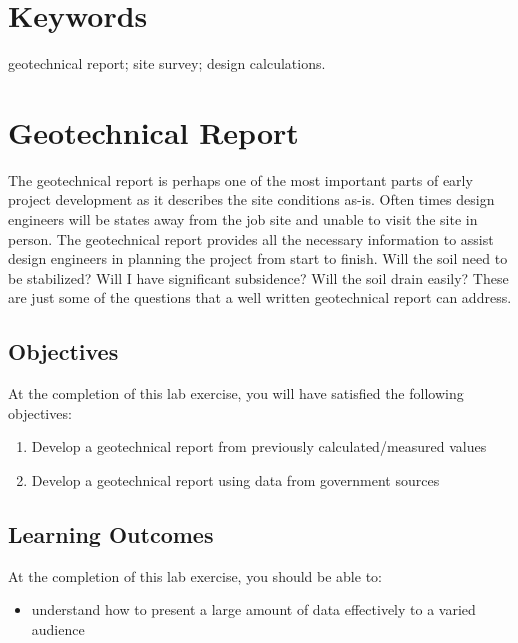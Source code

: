 \documentclass[12pt]{article}
\begin{document}
\vfill
\section*{Keywords}
\normalsize geotechnical report; site survey; design calculations.\\
\pagebreak
\begin{center}
\tableofcontents
\pagebreak
\listoftables
\listoffigures
\end{center}
\pagebreak

\section{Geotechnical Report}
\label{sec:intro}
\normalsize 
The geotechnical report is perhaps one of the most important parts of early project development as it describes the site conditions as-is. Often times design engineers will be states away from the job site and unable to visit the site in person. The geotechnical report provides all the necessary information to assist design engineers in planning the project from start to finish. Will the soil need to be stabilized? Will I have significant subsidence? Will the soil drain easily? These are just some of the questions that a well written geotechnical report can address.

\subsection{Objectives}
\label{ssec:headingscap}
At the completion of this lab exercise, you will have satisfied the following objectives:
\begin{enumerate}
    \item Develop a geotechnical report from previously calculated/measured values
    \item Develop a geotechnical report using data from government sources
\end{enumerate}

\subsection{Learning Outcomes}
At the completion of this lab exercise, you should be able to:
\begin{itemize}
    \item understand how to present a large amount of data effectively to a varied audience
\end{itemize}
\end{document}
